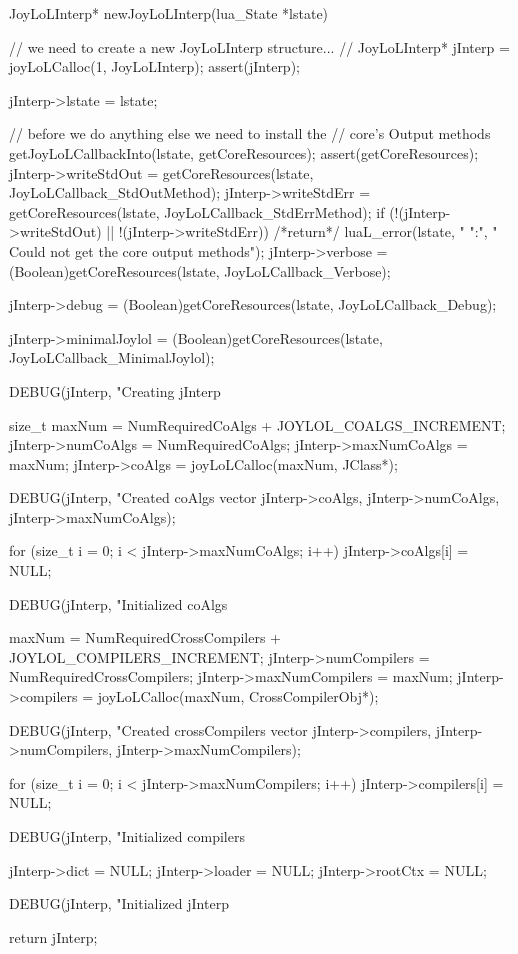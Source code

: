 \startCCode
JoyLoLInterp* newJoyLoLInterp(lua_State *lstate) {
  // we need to create a new JoyLoLInterp structure...
  //
  JoyLoLInterp* jInterp = joyLoLCalloc(1, JoyLoLInterp);
  assert(jInterp);

  jInterp->lstate = lstate;
  
  // before we do anything else we need to install the
  // core's Output methods
  getJoyLoLCallbackInto(lstate, getCoreResources);
  assert(getCoreResources);
  jInterp->writeStdOut =
    getCoreResources(lstate, JoyLoLCallback_StdOutMethod);
  jInterp->writeStdErr =
    getCoreResources(lstate, JoyLoLCallback_StdErrMethod);
  if (!(jInterp->writeStdOut) || !(jInterp->writeStdErr)) {
    /*return*/ luaL_error(lstate, "%
      "\nERROR:\n",
      "  Could not get the core output methods\n");
  }
  jInterp->verbose = 
    (Boolean)getCoreResources(lstate, JoyLoLCallback_Verbose);
    
  jInterp->debug = 
    (Boolean)getCoreResources(lstate, JoyLoLCallback_Debug);
    
  jInterp->minimalJoylol =
    (Boolean)getCoreResources(lstate, JoyLoLCallback_MinimalJoylol);

  DEBUG(jInterp, "Creating jInterp %
    
  size_t maxNum =
    NumRequiredCoAlgs + JOYLOL_COALGS_INCREMENT;
  jInterp->numCoAlgs    = NumRequiredCoAlgs;
  jInterp->maxNumCoAlgs = maxNum;
  jInterp->coAlgs       = joyLoLCalloc(maxNum, JClass*);
  
  DEBUG(jInterp, "Created coAlgs vector %
    jInterp->coAlgs, jInterp->numCoAlgs, jInterp->maxNumCoAlgs);
  
  for (size_t i = 0; i < jInterp->maxNumCoAlgs; i++) {
    jInterp->coAlgs[i] = NULL;
  }

  DEBUG(jInterp, "Initialized coAlgs %
  
  maxNum =
    NumRequiredCrossCompilers + JOYLOL_COMPILERS_INCREMENT;
  jInterp->numCompilers    = NumRequiredCrossCompilers;
  jInterp->maxNumCompilers = maxNum;
  jInterp->compilers       = joyLoLCalloc(maxNum, CrossCompilerObj*);

  DEBUG(jInterp, "Created crossCompilers vector %
    jInterp->compilers, 
    jInterp->numCompilers,
    jInterp->maxNumCompilers);

  for (size_t i = 0; i < jInterp->maxNumCompilers; i++) {
    jInterp->compilers[i] = NULL;
  }

  DEBUG(jInterp, "Initialized compilers %

  jInterp->dict    = NULL;
  jInterp->loader  = NULL;
  jInterp->rootCtx = NULL;
    
  DEBUG(jInterp, "Initialized jInterp %

  return jInterp;
}
\stopCCode


